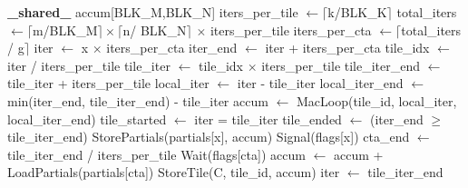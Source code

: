 \begin{algorithm}

    \footnotesize
    \caption{Basic \textit{Stream-K} GPU GEMM with grid size $g$.}\label{alg:streamk}
    \begin{algorithmic}[1]
    \State \textbf{\_shared\_}  accum[BLK\_M,BLK\_N]
    \State iters\_per\_tile $\gets \lceil$k/BLK\_K$\rceil$
    \State total\_iters $\gets \lceil$m/BLK\_M$\rceil \times \lceil$n/ BLK\_N$\rceil$ $\times$ iters\_per\_tile
    \State iters\_per\_cta $\gets \lceil$total\_iters / g$\rceil$
        \State iter $\gets$ x $\times$ iters\_per\_cta
        \State iter\_end $\gets$ iter + iters\_per\_cta
            \State tile\_idx $\gets$ iter / iters\_per\_tile
            \State tile\_iter $\gets$ tile\_idx $\times$ iters\_per\_tile
            \State tile\_iter\_end $\gets$ tile\_iter + iters\_per\_tile
            \State local\_iter $\gets$ iter - tile\_iter
            \State local\_iter\_end $\gets$
            \State \quad min(iter\_end, tile\_iter\_end) - tile\_iter
            \State accum $\gets$
            \State \quad MacLoop(tile\_id, local\_iter, local\_iter\_end)
            \State tile\_started $\gets$ iter = tile\_iter
            \State tile\_ended $\gets$ (iter\_end $\geq$ tile\_iter\_end)
                \State StorePartials(partials[x], accum) \State Signal(flags[x])
            \Else
                \State cta\_end $\gets$ tile\_iter\_end / iters\_per\_tile
                    \State Wait(flags[cta])
                    \State accum $\gets$ accum \State \quad + LoadPartials(partials[cta])
                \EndFor
                \EndIf \State StoreTile(C, tile\_id, accum) \EndIf \State iter $\gets$ tile\_iter\_end
        \EndWhile
    \EndFork
    \end{algorithmic}
\end{algorithm}

